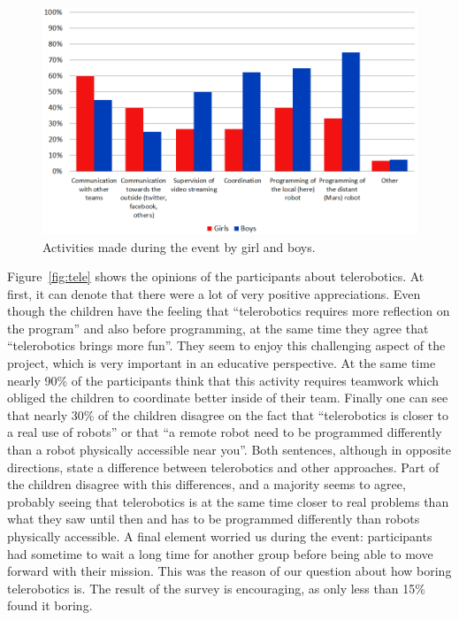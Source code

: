 \documentclass{intech-journal}
\begin{document}
\begin{figure}[ht]
 \centering
    \includegraphics[width=0.7\columnwidth]{figures/activities.png}
  \caption{Activities made during the event by girl and boys.}
  \label{fig:activities} 
\end{figure}

Figure~\ref{fig:tele} shows the opinions of the participants about telerobotics. 
At first, it can denote that there were a lot of very positive appreciations. 
Even though the children have the feeling that ``telerobotics requires more reflection on the program'' and also before programming, at the same time they agree that ``telerobotics brings more fun''. 
They seem to enjoy this challenging aspect of the project, which is very important in an educative perspective. 
At the same time nearly 90\% of the participants think that this activity requires teamwork which obliged the children to coordinate better inside of their team. 
Finally one can see that nearly 30\% of the children disagree on the fact that ``telerobotics is closer to a real use of robots'' or that ``a remote robot need to be programmed differently than a robot physically accessible near you''. 
Both sentences, although in opposite directions, state a difference between telerobotics and other approaches.
Part of the children disagree with this differences, and a majority seems to agree, probably seeing that telerobotics is at the same time closer to real problems than what they saw until then and has to be programmed differently than robots physically accessible.
A final element worried us during the event: participants had sometime to wait a long time for another group before being able to move forward with their mission. 
This was the reason of our question about how boring telerobotics is.
The result of the survey is encouraging, as only less than 15\% found it boring.
\end{document}
